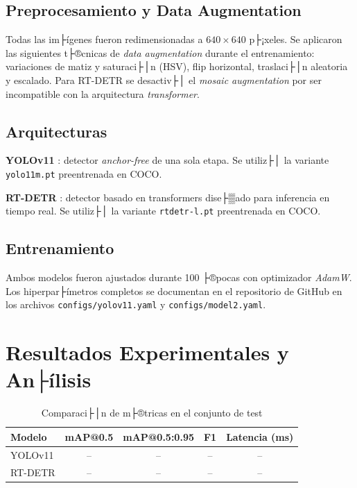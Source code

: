 ﻿\documentclass[conference]{IEEEtran}
\begin{document}
\subsection{Preprocesamiento y Data Augmentation}

Todas las im├ígenes fueron redimensionadas a $640 \times 640$ p├¡xeles. Se
aplicaron las siguientes t├®cnicas de \textit{data augmentation} durante
el entrenamiento: variaciones de matiz y saturaci├│n (HSV), flip horizontal,
traslaci├│n aleatoria y escalado. Para RT-DETR se desactiv├│ el \textit{mosaic
augmentation} por ser incompatible con la arquitectura \textit{transformer}.

\subsection{Arquitecturas}

\textbf{YOLOv11} \cite{b3}: detector \textit{anchor-free} de una sola etapa.
Se utiliz├│ la variante \texttt{yolo11m.pt} preentrenada en COCO.

\textbf{RT-DETR} \cite{b4}: detector basado en transformers dise├▒ado para
inferencia en tiempo real. Se utiliz├│ la variante \texttt{rtdetr-l.pt}
preentrenada en COCO.

\subsection{Entrenamiento}

Ambos modelos fueron ajustados durante 100 ├®pocas con optimizador
\textit{AdamW}. Los hiperpar├ímetros completos se documentan en el repositorio
de GitHub en los archivos \texttt{configs/yolov11.yaml} y
\texttt{configs/model2.yaml}.

\section{Resultados Experimentales y An├ílisis}


\begin{table}[htbp]
\caption{Comparaci├│n de m├®tricas en el conjunto de test}
\begin{center}
\begin{tabular}{lcccc}
\toprule
\textbf{Modelo} & \textbf{mAP@0.5} & \textbf{mAP@0.5:0.95} & \textbf{F1} & \textbf{Latencia (ms)} \\
\midrule
YOLOv11  & -- & -- & -- & -- \\
RT-DETR  & -- & -- & -- & -- \\
\bottomrule
\end{tabular}
\end{center}
\end{table}
\end{document}
